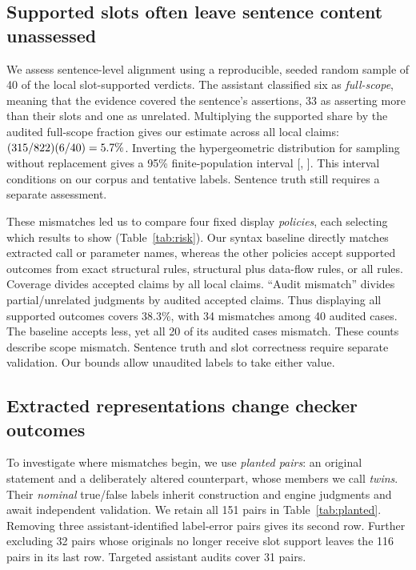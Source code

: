 \subsection{Supported slots often leave sentence content unassessed}
We assess sentence-level alignment using a reproducible, seeded random sample of 40 of the \RevSupported{} local slot-supported verdicts. The assistant classified six as \emph{full-scope}, meaning that the evidence covered the sentence's assertions, 33 as asserting more than their slots and one as unrelated. Multiplying the supported share by the audited full-scope fraction gives our estimate across all local claims: $(315/822)(6/40)=5.7\%$. Inverting the hypergeometric distribution for sampling without replacement gives a 95\% finite-population interval [\RevFullLo, \RevFullHi]. This interval conditions on our corpus and tentative labels. Sentence truth still requires a separate assessment.


These mismatches led us to compare four fixed display \emph{policies}, each selecting which results to show (Table~\ref{tab:risk}). Our syntax baseline directly matches extracted call or parameter names, whereas the other policies accept supported outcomes from exact structural rules, structural plus data-flow rules, or all rules. Coverage divides accepted claims by all \RevLocalClaims{} local claims. ``Audit mismatch'' divides partial/unrelated judgments by audited accepted claims. Thus displaying all supported outcomes covers 38.3\%, with 34 mismatches among 40 audited cases. The baseline accepts less, yet all 20 of its audited cases mismatch. These counts describe scope mismatch. Sentence truth and slot correctness require separate validation. Our bounds allow unaudited labels to take either value.

\subsection{Extracted representations change checker outcomes}

To investigate where mismatches begin, we use \emph{planted pairs}: an original statement and a deliberately altered counterpart, whose members we call \emph{twins}. Their \emph{nominal} true/false labels inherit construction and engine judgments and await independent validation. We retain all 151 pairs in Table~\ref{tab:planted}. Removing three assistant-identified label-error pairs gives its second row. Further excluding 32 pairs whose originals no longer receive slot support leaves the 116 pairs in its last row. Targeted assistant audits cover 31 pairs.

